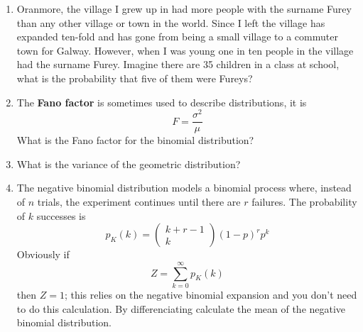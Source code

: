 \documentclass[11pt,a4paper]{scrartcl}
\begin{document}
\begin{enumerate}

\item Oranmore, the village I grew up in had more people with the
  surname Furey than any other village or town in the world. Since I
  left the village has expanded ten-fold and has gone from being a
  small village to a commuter town for Galway. However, when I was young
  one in ten people in the village had the surname Furey. Imagine
  there are 35 children in a class at school, what is the probability
  that five of them were Fureys?

\item The \textbf{Fano factor} is sometimes used to describe distributions, it is
  \begin{equation}
    F=\frac{\sigma^2}{\mu}
  \end{equation}
What is the Fano factor for the binomial distribution?

\item What is the variance of the geometric distribution?

\item The negative binomial distribution models a binomial process
  where, instead of $n$ trials, the experiment continues until there
  are $r$ failures. The probability of $k$ successes is
  \begin{equation}
    p_K(k)=\left(\begin{array}{c}k+r-1\\k\end{array}\right)(1-p)^rp^k
  \end{equation}
Obviously if
  \begin{equation}
    Z=\sum_{k=0}^\infty p_K(k)
  \end{equation}
  then $Z=1$; this relies on the negative binomial expansion and
  you don't need to do this calculation. By differenciating calculate
  the mean of the negative binomial distribution.
\end{enumerate}
\end{document}
